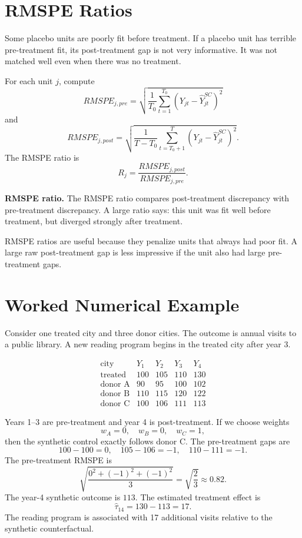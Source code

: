 \section{RMSPE Ratios}

Some placebo units are poorly fit before treatment. If a placebo unit has terrible pre-treatment fit, its post-treatment gap is not very informative. It was not matched well even when there was no treatment.

For each unit \(j\), compute
\[
RMSPE_{j,pre}
=
\sqrt{
\frac{1}{T_0}
\sum_{t=1}^{T_0}
\left(Y_{jt}-\widehat{Y}^{SC}_{jt}\right)^2
}
\]
and
\[
RMSPE_{j,post}
=
\sqrt{
\frac{1}{T-T_0}
\sum_{t=T_0+1}^{T}
\left(Y_{jt}-\widehat{Y}^{SC}_{jt}\right)^2
}.
\]
The RMSPE ratio is
\[
R_j=\frac{RMSPE_{j,post}}{RMSPE_{j,pre}}.
\]

\begin{defN}
\textbf{RMSPE ratio.} The RMSPE ratio compares post-treatment discrepancy with pre-treatment discrepancy. A large ratio says: this unit was fit well before treatment, but diverged strongly after treatment.
\end{defN}

RMSPE ratios are useful because they penalize units that always had poor fit. A large raw post-treatment gap is less impressive if the unit also had large pre-treatment gaps.

\section{Worked Numerical Example}

Consider one treated city and three donor cities. The outcome is annual visits to a public library. A new reading program begins in the treated city after year 3.

\[
\begin{array}{c|ccc|c}
\text{city} & Y_1 & Y_2 & Y_3 & Y_4\\
\hline
\text{treated} & 100 & 105 & 110 & 130\\
\text{donor A} & 90 & 95 & 100 & 102\\
\text{donor B} & 110 & 115 & 120 & 122\\
\text{donor C} & 100 & 106 & 111 & 113
\end{array}
\]

Years 1--3 are pre-treatment and year 4 is post-treatment. If we choose weights
\[
w_A=0,\quad w_B=0,\quad w_C=1,
\]
then the synthetic control exactly follows donor C. The pre-treatment gaps are
\[
100-100=0,\quad 105-106=-1,\quad 110-111=-1.
\]
The pre-treatment RMSPE is
\[
\sqrt{\frac{0^2+(-1)^2+(-1)^2}{3}}
=
\sqrt{\frac{2}{3}}
\approx 0.82.
\]
The year-4 synthetic outcome is \(113\). The estimated treatment effect is
\[
\widehat{\tau}_{14}=130-113=17.
\]
The reading program is associated with 17 additional visits relative to the synthetic counterfactual.

